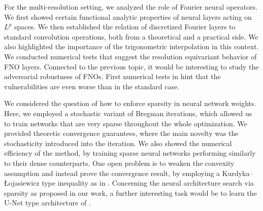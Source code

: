 For the multi-resolution setting, we analyzed the role of Fourier neural operators. We first showed certain functional analytic properties of neural layers acting on $L^p$ spaces. We then established the relation of discretized Fourier layers to standard convolution operations, both from a theoretical and a practical side. We also highlighted the importance of the trigonometric interpolation in this context. We conducted numerical tests that suggest the resolution equivariant behavior of FNO layers. Connected to the previous topic, it would be interesting to study the adversarial robustness of FNOs. First numerical tests in \cite{kabri2022FNO} hint that the vulnerabilities are even worse than in the standard case.

We considered the question of how to enforce sparsity in neural network weights. Here, we employed a stochastic variant of Bregman iterations, which allowed us to train networks that are very sparse throughout the whole optimization. We provided theoretic convergence guarantees, where the main novelty was the stochasticity introduced into the iteration. We also showed the numerical efficiency of the method, by training sparse neural networks performing similarly to their dense counterparts. One open problem is to weaken the convexity assumption and instead prove the convergence result, by employing a Kurdyka–\L{}ojasiewicz type inequality as in \cite{benning2018choose}. Concerning the neural architecture search via sparsity as proposed in our work, a further interesting task would be to learn the U-Net type architecture of \cite{ronneberger2015u}.
